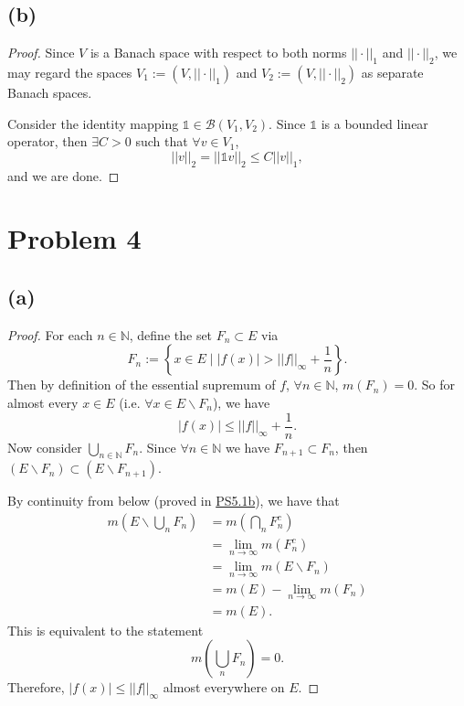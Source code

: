 \documentclass{article}
\newcommand{\N}{\mathbb{N}} %
\begin{document}
\subsection*{(b)}
\begin{proof}
	Since $V$ is a Banach space with respect to both norms $||\cdot||_1$ and $||\cdot||_2$, we may regard the spaces $V_1 := (V, ||\cdot||_1)$ and $V_2 := (V, ||\cdot||_2)$ as separate Banach spaces.
	
	Consider the identity mapping $\mathds{1} \in \mathcal{B}(V_1, V_2)$. Since $\mathds{1}$ is a bounded linear operator, then $\exists C > 0$ such that $\forall v \in V_1$,
	\begin{equation}
		||v||_2 = ||\mathds{1} v||_2 \leq C ||v||_1,
	\end{equation}
	and we are done.
\end{proof}
\section*{Problem 4}
\subsection*{(a)}
\begin{proof}
	For each $n \in \N$, define the set $F_n \subset E$ via 
	\begin{equation}
		F_n := \left\{x \in E \;|\; |f(x)| > ||f||_{\infty} + \frac{1}{n}\right\}.
	\end{equation}
	Then by definition of the essential supremum of $f$, $\forall n \in \N$, $m(F_n) = 0$. So for almost every $x \in E$ (i.e. $\forall x \in E \backslash F_n$), we have
	\begin{equation}
		|f(x)| \leq ||f||_{\infty} + \frac{1}{n}.
	\end{equation}
	Now consider $\bigcup_{n \in \N}F_n$. Since $\forall n \in \N$ we have $F_{n+1} \subset F_n$, then $(E \backslash F_n) \subset (E \backslash F_{n+1})$.
	
	By continuity from below (proved in \href{https://github.com/ovega14/FunctionalAnalysis_solutions/blob/main/PS5/18.102_ps5.pdf}{PS5.1b}), we have that
	\begin{align}
		m\left(E \backslash \bigcup_n F_n\right) &= m\left(\bigcap_n F_n^c\right) \\
		&= \lim_{n \to \infty} m(F_n^c) \\
		&= \lim_{n \to \infty} m(E \backslash F_n) \\
		&= m(E) - \lim_{n \to \infty}m(F_n) \\
		&= m(E).
	\end{align}
	This is equivalent to the statement
	\begin{equation}
		m\left(\bigcup_n F_n\right) = 0.
	\end{equation}
	Therefore, $|f(x)| \leq ||f||_{\infty}$ almost everywhere on $E$.
\end{proof}
\end{document}
